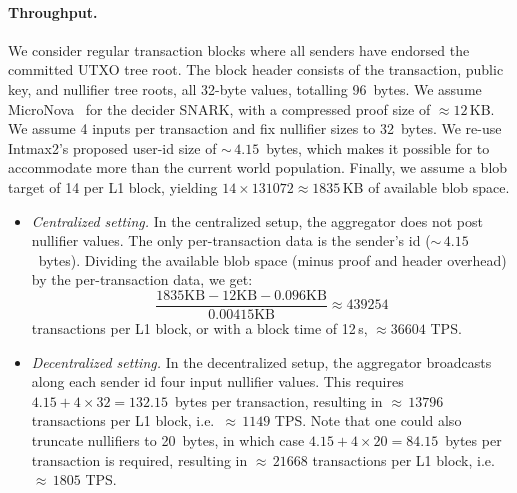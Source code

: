 \paragraph{Throughput.}
We consider regular transaction blocks where all senders have endorsed the committed \ac{UTXO} tree root.
The block header consists of the transaction, public key, and nullifier tree roots, all 32-byte values, totalling 96~bytes.
We assume MicroNova~\cite{SP:ZSCZ25} for the decider SNARK, with a compressed proof size of $\approx 12$\,KB.
We assume 4 inputs per transaction and fix nullifier sizes to 32~bytes.
We re-use Intmax2's proposed user-id size of ${\sim}\,4.15$~bytes, which makes it possible for \Protocol to accommodate more than the current world population.
Finally, we assume a blob target of 14 per \ac{L1} block, yielding $14 \times 131072 \approx 1835$\,KB of available blob space.

\begin{itemize}
  \item \textit{Centralized setting.} In the centralized setup, the aggregator does not post nullifier values.
The only per-transaction data is the sender's id (${\sim}\,4.15$~bytes).
Dividing the available blob space (minus proof and header overhead) by the per-transaction data, we get:
$$\frac{1835 \text{KB} - 12 \text{KB} - 0.096 \text{KB}}{{0.00415 \text{KB}}} \approx 439254$$
transactions per \ac{L1} block, or with a block time of 12\,s, $\approx 36604$ \ac{TPS}.


  \item \textit{Decentralized setting.} In the decentralized setup, the aggregator broadcasts along each sender id four input nullifier values.
This requires $4.15 + 4 \times 32 = 132.15$~bytes per transaction, resulting in ${\approx}\,13796$ transactions per \ac{L1} block, i.e.\ ${\approx}\,1149$ \ac{TPS}.
Note that one could also truncate nullifiers to 20~bytes, in which case $4.15 + 4 \times 20 = 84.15$~bytes per transaction is required, resulting in ${\approx}\,21668$ transactions per \ac{L1} block, i.e.\ ${\approx}\,1805$ \ac{TPS}.

\end{itemize}
